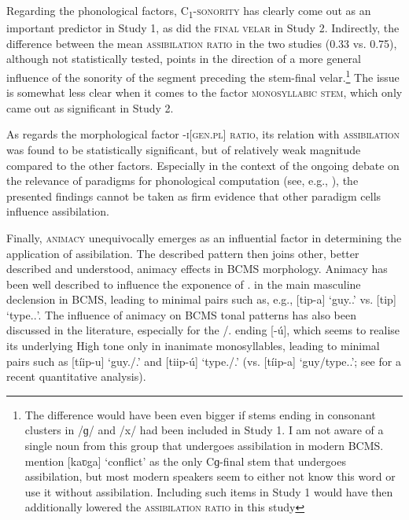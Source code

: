 \documentclass[output=paper,colorlinks,citecolor=brown]{langscibook}
\begin{document}
Regarding the phonological factors, \textsc{C\textsubscript{1}-sonority} has clearly come out as an important predictor in Study 1, as did the \textsc{final velar} in Study 2. Indirectly, the difference between the mean \textsc{assibilation ratio} in the two studies (0.33 vs. 0.75), although not statistically tested, points in the direction of a more general influence of the sonority of the segment preceding the stem-final velar.\footnote{The difference would have been even bigger if stems ending in consonant clusters in {/ɡ/} and {/x/} had been included in Study 1. I am not aware of a single noun from this group that undergoes assibilation in modern BCMS. \citet[154]{Bar1995} mention [{kaʋga}] `conflict' as the only Cɡ-final stem that undergoes assibilation, but most modern speakers seem to either not know this word or use it without assibilation. Including such items in Study 1 would have then additionally lowered the \textsc{assibilation ratio} in this study} The issue is somewhat less clear when it comes to the factor \textsc{monosyllabic stem}, which only came out as significant in Study 2.

As regards the morphological factor \textsc{\nobreakdash-i[gen.pl] ratio}, its relation with \textsc{assibilation} was found to be statistically significant, but of relatively weak magnitude compared to the other factors. Especially in the context of the ongoing debate on the relevance of paradigms for phonological computation (see, e.g., \citealt[]{bobaljik2008paradigms}), the presented findings cannot be taken as firm evidence that other paradigm cells influence assibilation.   

Finally, \textsc{animacy} unequivocally emerges as an influential factor in determining the application of assibilation. The described pattern then joins other, better described and understood, animacy effects in BCMS morphology. Animacy has been well described to influence the exponence of {\ACC.\SG} in the main masculine declension in BCMS, leading to minimal pairs such as, e.g., [{tip-a}] `guy.{\ACC.\SG}' vs. [{tip}] `type.\textsc{\ACC.\SG}'. The influence of animacy on BCMS tonal patterns has also been discussed in the literature, especially for the {\DAT/\LOC.\SG} ending [{-ú}], which seems to realise its underlying High tone only in inanimate monosyllables, leading to minimal pairs such as [{tíip-u}] `guy.{\DAT/\LOC.\SG}' and [{tiip-ú}] `type.{\DAT/\LOC.\SG}' (vs. [{tíip-a}] `guy/type.{\GEN.\SG}'; see \citealt{martinovic2012interaction} for a recent quantitative analysis).
\end{document}
